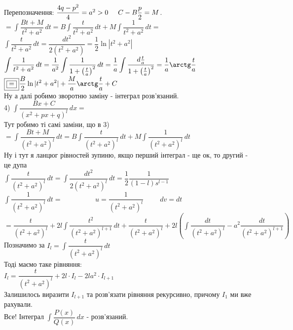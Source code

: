 \documentclass[a4paper, 10pt]{article}
\def\huge{\displaystyle}
\theoremstyle{theoremdd}
\theoremstyle{theoremdd}
\theoremstyle{theoremdd}
\theoremstyle{theoremdd}
\theoremstyle{theoremdd}
\theoremstyle{theoremdd}
\theoremstyle{theoremdd}
\theoremstyle{theoremdd}
\begin{document}
Перепозначення: $\dfrac{4q-p^2}{4} = a^2 > 0 \hspace{0.5cm} C - B \dfrac{p}{2} = M$.\\
$\boxed{=} \huge \int \dfrac{Bt + M}{t^2 + a^2}\,dt = B \int \dfrac{t}{t^2+a^2}\,dt + M \int \dfrac{1}{t^2+a^2}\,dt \boxed{\boxed{=}}$\\
$\huge \int \dfrac{t}{t^2+a^2}\,dt = \dfrac{dt^2}{2(t^2+a^2)} = \dfrac{1}{2} \ln|t^2+a^2|$\\
$\huge \int \dfrac{1}{t^2+a^2}\,dt = \dfrac{1}{a^2} \int \dfrac{1}{1 + \left(\frac{t}{a}\right)^2}\,dt = \dfrac{1}{a} \int \dfrac{d \frac{t}{a}}{1 + \left(\frac{t}{a}\right)^2} = \dfrac{1}{a} \arctg \dfrac{t}{a}$\\
$\boxed{\boxed{=}} \huge \frac{B}{2} \ln|t^2+a^2| + \frac{M}{a} \arctg \frac{t}{a} + C$\\
Ну а далі робимо зворотню заміну - інтеграл розв'язаний.
\bigskip \\
4) $\huge \int \dfrac{Bx+C}{(x^2+px+q)^l}\,dx \boxed{=}$\\
Тут робимо ті самі заміни, що в 3)\\
$\boxed{=} \huge \int \dfrac{Bt+M}{(t^2+a^2)^l}\,dt = B \int \dfrac{t}{(t^2+a^2)^l} \,dt + M \int \dfrac{1}{(t^2+a^2)^l}\,dt$\\
Ну і тут я ланцюг рівностей зупиню, якщо перший інтеграл - ще ок, то другий - це дупа\\
$\huge \int \dfrac{t}{(t^2+a^2)^l}\,dt = \int \dfrac{dt^2}{2(t^2+a^2)^l}\,dt = \dfrac{1}{2} \dfrac{1}{(1-l)s^{l-1}}$ \bigskip \\
$\huge \int \dfrac{1}{(t^2+a^2)^l}\,dt \boxed{=} \hspace{2cm} u = \dfrac{1}{(t^2+a^2)^l} \hspace{1cm} dv = dt$\\
$\boxed{=} \huge \dfrac{t}{(t^2+a^2)^l} + 2l \int \dfrac{t^2}{(t^2+a^2)^{l+1}}\,dt + \dfrac{t}{(t^2+a^2)^l} + 2l \left(\int \dfrac{dt}{(t^2+a^2)^l} - a^2 \dfrac{dt}{(t^2+a^2)^{l+1}} \right)$\\
Позначимо за $I_l = \huge \int \dfrac{t}{(t^2+a^2)^l}\,dt$\\
Тоді маємо таке рівняння:\\
$I_l = \dfrac{t}{(t^2+a^2)^l} + 2l \cdot I_l - 2la^2 \cdot I_{l+1}$\\
Залишилось виразити $I_{l+1}$ та розв'язати рівняння рекурсивно, причому $I_1$ ми вже рахували.
\bigskip \\
Все! Інтеграл $\huge\int \dfrac{P(x)}{Q(x)}\,dx$ - розв'язаний.
\bigskip \\
\end{document}
